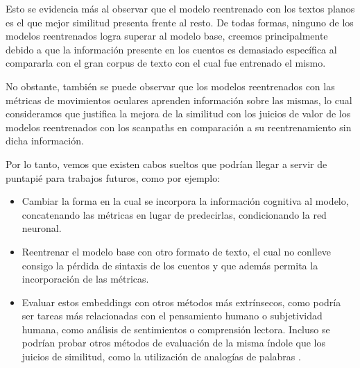 Esto se evidencia más al observar que el modelo reentrenado con los textos 
planos es el que mejor similitud presenta frente al resto. De todas formas, 
ninguno de los modelos reentrenados logra superar al modelo base, creemos 
principalmente debido a que la información presente en los cuentos es demasiado 
específica al compararla con el gran corpus de texto con el cual fue entrenado el mismo.

No obstante, también se puede observar que los modelos reentrenados con las 
métricas de movimientos oculares aprenden información sobre las mismas, lo 
cual consideramos que justifica la mejora de la similitud con los juicios de 
valor de los modelos reentrenados con los scanpaths en comparación a su 
reentrenamiento sin dicha información.

Por lo tanto, vemos que existen cabos sueltos que podrían llegar a servir 
de puntapié para trabajos futuros, como por ejemplo:

\begin{itemize}
    \item Cambiar la forma en la cual se incorpora la información cognitiva al modelo, 
    concatenando las métricas \parencite{hollenstein2019} en lugar de 
    predecirlas, condicionando la red neuronal.
    \item Reentrenar el modelo base con otro formato de texto, el cual no 
    conlleve consigo la pérdida de sintaxis de los cuentos y que además 
    permita la incorporación de las métricas.
    \item Evaluar estos embeddings con otros métodos más extrínsecos, 
    como podría ser tareas más relacionadas con el pensamiento humano o 
    subjetividad humana, como análisis de sentimientos o comprensión lectora. 
    Incluso se podrían probar otros métodos de evaluación de la misma 
    índole que los juicios de similitud, como la utilización de 
    analogías de palabras \parencite{Wang_2019}.
\end{itemize}
